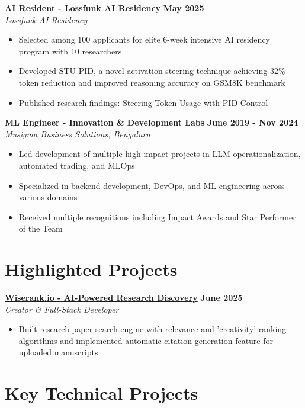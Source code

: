 \documentclass[11pt]{article}
\begin{document}
\textbf{AI Resident - Lossfunk AI Residency} \hfill \textbf{May 2025} \\
\textit{Lossfunk AI Residency}
\begin{itemize}[leftmargin=*, nosep]
\item Selected among 100 applicants for elite 6-week intensive AI residency program with 10 researchers
\item Developed \href{https://github.com/rokosbasilisk/STU-PID}{STU-PID}, a novel activation steering technique achieving 32\% token reduction and improved reasoning accuracy on GSM8K benchmark
\item Published research findings: \href{https://arxiv.org/abs/2506.18831}{Steering Token Usage with PID Control}
\end{itemize}

\textbf{ML Engineer - Innovation \& Development Labs} \hfill \textbf{June 2019 - Nov 2024} \\
\textit{Musigma Business Solutions, Bengaluru}
\begin{itemize}[leftmargin=*, nosep]
\item Led development of multiple high-impact projects in LLM operationalization, automated trading, and MLOps
\item Specialized in backend development, DevOps, and ML engineering across various domains
\item Received multiple recognitions including Impact Awards and Star Performer of the Team
\end{itemize}

\section{Highlighted Projects}

\textbf{\href{https://wiserank.io}{Wiserank.io - AI-Powered Research Discovery}} \hfill \textbf{June 2025} \\
\textit{Creator \& Full-Stack Developer}
\begin{itemize}[leftmargin=*, nosep]
\item Built research paper search engine with relevance and 'creativity' ranking algorithms and implemented automatic citation generation feature for uploaded manuscripts
\end{itemize}

\section{Key Technical Projects}
\end{document}
